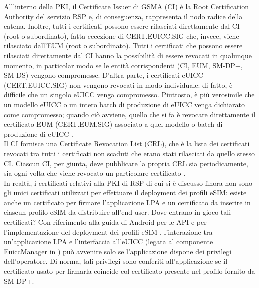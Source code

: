 \documentclass[10pt, oneside]{book}
\begin{document}
All'interno della PKI, il Certificate Issuer di GSMA (CI) è la Root Certification Authority del servizio RSP e, di conseguenza, rappresenta il nodo radice della catena. Inoltre, tutti i certificati possono essere rilasciati direttamente dal CI (root o subordinato), fatta eccezione di CERT.EUICC.SIG che, invece, viene rilasciato dall'EUM (root o subordinato). Tutti i certificati che possono essere rilasciati direttamente dal CI hanno la possibilità di essere revocati in qualunque momento, in particolar modo se le entità corrispondenti (CI, EUM, SM-DP+, SM-DS) vengono compromesse. D'altra parte, i certificati eUICC (CERT.EUICC.SIG) non vengono revocati in modo individuale: di fatto, è difficile che un singolo eUICC venga compromesso. Piuttosto, è più verosimile che un modello eUICC o un intero batch di produzione di eUICC venga dichiarato come compromesso; quando ciò avviene, quello che si fa è revocare direttamente il certificato EUM (CERT.EUM.SIG) associato a quel modello o batch di produzione di eUICC \cite{GSMA-docs-new}.\\
Il CI fornisce una Certificate Revocation List (CRL), che è la lista dei certificati revocati tra tutti i certificati non scaduti che erano stati rilasciati da quello stesso CI. Ciascun CI, per giunta, deve pubblicare la propria CRL sia periodicamente, sia ogni volta che viene revocato un particolare certificato \cite{GSMA-docs-new}.\\
In realtà, i certificati relativi alla PKI di RSP di cui si è discusso finora non sono gli unici certificati utilizzati per effettuare il deployment dei profili eSIM: esiste anche un certificato per firmare l'applicazione LPA e un certificato da inserire in ciascun profilo eSIM da distribuire all'end user. Dove entrano in gioco tali certificati? Con riferimento alla guida di Android per le API e per l'implementazione del deployment dei profili eSIM \cite{Android-docs}, l'interazione tra un'applicazione LPA e l'interfaccia all'eUICC (legata al componente EuiccManager in \cite{Android-docs}) può avvenire solo se l'applicazione dispone dei privilegi dell'operatore. Di norma, tali privilegi sono conferiti all'applicazione se il certificato usato per firmarla coincide col certificato presente nel profilo fornito da SM-DP+.
\end{document}

